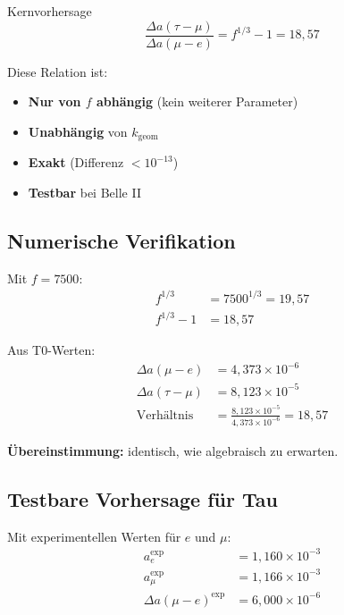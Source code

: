 	\begin{important}{Kernvorhersage}
		\begin{equation}
			\boxed{\frac{\Delta a(\tau - \mu)}{\Delta a(\mu - e)} = f^{1/3} - 1 = 18{,}57}
		\end{equation}
		
		Diese Relation ist:
		\begin{itemize}
			\item \textbf{Nur von $f$ abhängig} (kein weiterer Parameter)
			\item \textbf{Unabhängig} von $k_{\text{geom}}$
			\item \textbf{Exakt} (Differenz $< 10^{-13}$)
			\item \textbf{Testbar} bei Belle II
		\end{itemize}
	\end{important}
	
	\subsection{Numerische Verifikation}
	
	Mit $f = 7500$:
	\begin{align}
		f^{1/3} &= 7500^{1/3} = 19{,}57 \\
		f^{1/3} - 1 &= 18{,}57
	\end{align}
	
	Aus T0-Werten:
	\begin{align}
		\Delta a(\mu - e) &= 4{,}373 \times 10^{-6} \\
		\Delta a(\tau - \mu) &= 8{,}123 \times 10^{-5} \\
		\text{Verhältnis} &= \frac{8{,}123 \times 10^{-5}}{4{,}373 \times 10^{-6}} = 18{,}57
	\end{align}
	
	\textbf{Übereinstimmung:} identisch, wie algebraisch zu erwarten.
	
	\subsection{Testbare Vorhersage für Tau}
	
	Mit experimentellen Werten für $e$ und $\mu$:
	\begin{align}
		a_e^{\text{exp}} &= 1{,}160 \times 10^{-3} \\
		a_\mu^{\text{exp}} &= 1{,}166 \times 10^{-3} \\
		\Delta a(\mu - e)^{\text{exp}} &= 6{,}000 \times 10^{-6}
	\end{align}
	
